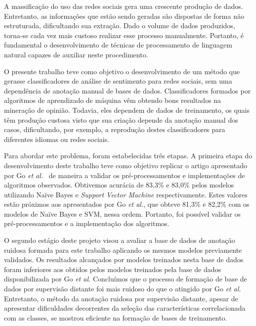 A massificação do uso das redes sociais gera uma crescente produção de dados.
Entretanto, as informações que estão sendo geradas são dispostas de forma não estruturada, dificultando sua extração.
Dado o volume de dados produzidos, torna-se cada vez mais custoso realizar esse processo manualmente.
Portanto, é fundamental o desenvolvimento de técnicas de processamento de linguagem natural capazes de auxiliar neste
procedimento.

O presente trabalho teve como objetivo o desenvolvimento de um método que gerasse classificadores de análise de sentimento
para redes sociais, sem uma dependência de anotação manual de bases de dados.
Classificadores formados por algoritmos de aprendizado de máquina vêm obtendo bons resultados na mineração de opinião.
Todavia, eles dependem de dados de treinamento, os quais têm produção custosa visto que sua criação depende da anotação
manual dos casos, dificultando, por exemplo, a reprodução destes classificadores para diferentes idiomas ou redes
sociais.

Para abordar este problema, foram estabelecidas três etapas.
A primeira etapa do desenvolvimento deste trabalho teve como objetivo replicar o artigo apresentado por Go
\textit{et al.}~\cite{go09} de maneira a validar os pré-processamentos e implementações de algoritmos observados.
Obtivemos acurácia de 83,3\% e 83,0\% pelos modelos utilizando Naïve Bayes e \textit{Support Vector Machine} respectivamente.
Estes valores estão próximos aos apresentados por Go \textit{et al.}, que obteve 81,3\% e 82,2\% com os modelos de Naïve
Bayes e SVM, nessa ordem.
Portanto, foi possível validar os pré-processamentos e a implementação dos algoritmos.

O segundo estágio deste projeto visou a avaliar a base de dados de anotação ruidosa formada para este trabalho
aplicando os mesmos modelos previamente validados.
Os resultados alcançados por modelos treinados nesta base de dados foram inferiores aos obtidos pelos modelos treinados
pela base de dados disponibilizada por Go \textit{et al.}
Concluímos que o processo de formação de base de dados por supervisão distante foi mais ruidoso do que o atingido por
Go \textit{et al.}
Entretanto, o método da anotação ruidosa por supervisão distante, apesar de apresentar dificuldades decorrentes da
seleção das características correlacionada com as classes, se mostrou eficiente na formação de bases de treinamento.

